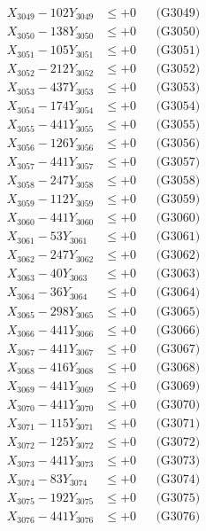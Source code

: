 \documentclass[a4paper,10pt]{article}
\begin{document}
{\begin{align}
X_{3049} - 102Y_{3049} &\leq +0 && \text{(G3049)} \\
X_{3050} - 138Y_{3050} &\leq +0 && \text{(G3050)} \\
\allowbreak
X_{3051} - 105Y_{3051} &\leq +0 && \text{(G3051)} \\
X_{3052} - 212Y_{3052} &\leq +0 && \text{(G3052)} \\
X_{3053} - 437Y_{3053} &\leq +0 && \text{(G3053)} \\
X_{3054} - 174Y_{3054} &\leq +0 && \text{(G3054)} \\
X_{3055} - 441Y_{3055} &\leq +0 && \text{(G3055)} \\
X_{3056} - 126Y_{3056} &\leq +0 && \text{(G3056)} \\
X_{3057} - 441Y_{3057} &\leq +0 && \text{(G3057)} \\
X_{3058} - 247Y_{3058} &\leq +0 && \text{(G3058)} \\
X_{3059} - 112Y_{3059} &\leq +0 && \text{(G3059)} \\
X_{3060} - 441Y_{3060} &\leq +0 && \text{(G3060)} \\
\allowbreak
X_{3061} - 53Y_{3061} &\leq +0 && \text{(G3061)} \\
X_{3062} - 247Y_{3062} &\leq +0 && \text{(G3062)} \\
X_{3063} - 40Y_{3063} &\leq +0 && \text{(G3063)} \\
X_{3064} - 36Y_{3064} &\leq +0 && \text{(G3064)} \\
X_{3065} - 298Y_{3065} &\leq +0 && \text{(G3065)} \\
X_{3066} - 441Y_{3066} &\leq +0 && \text{(G3066)} \\
X_{3067} - 441Y_{3067} &\leq +0 && \text{(G3067)} \\
X_{3068} - 416Y_{3068} &\leq +0 && \text{(G3068)} \\
X_{3069} - 441Y_{3069} &\leq +0 && \text{(G3069)} \\
X_{3070} - 441Y_{3070} &\leq +0 && \text{(G3070)} \\
\allowbreak
X_{3071} - 115Y_{3071} &\leq +0 && \text{(G3071)} \\
X_{3072} - 125Y_{3072} &\leq +0 && \text{(G3072)} \\
X_{3073} - 441Y_{3073} &\leq +0 && \text{(G3073)} \\
X_{3074} - 83Y_{3074} &\leq +0 && \text{(G3074)} \\
X_{3075} - 192Y_{3075} &\leq +0 && \text{(G3075)} \\
X_{3076} - 441Y_{3076} &\leq +0 && \text{(G3076)} \\

\end{align}}
\end{document}
